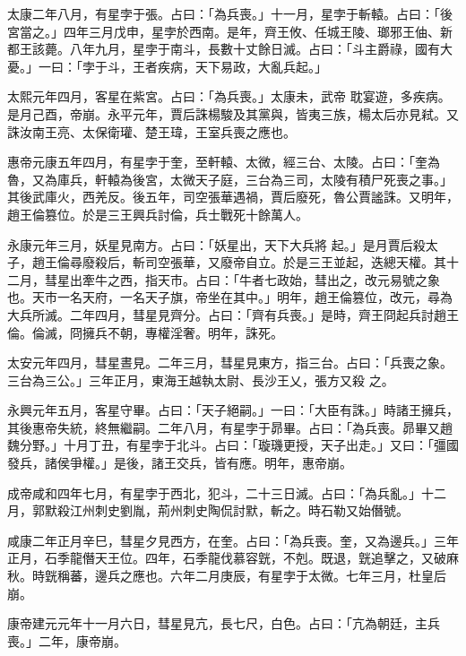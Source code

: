 \begin{pinyinscope}
 太康二年八月，有星孛于張。占曰：「為兵喪。」十一月，星孛于斬轅。占曰：「後宮當之。」四年三月戊申，星孛於西南。是年，齊王攸、任城王陵、瑯邪王伷、新都王該薨。八年九月，星孛于南斗，長數十丈餘日滅。占曰：「斗主爵祿，國有大憂。」一曰：「孛于斗，王者疾病，天下易政，大亂兵起。」



 太熙元年四月，客星在紫宮。占曰：「為兵喪。」太康未，武帝
 耽宴遊，多疾病。是月己酉，帝崩。永平元年，賈后誅楊駿及其黨與，皆夷三族，楊太后亦見弒。又誅汝南王亮、太保衛瓘、楚王瑋，王室兵喪之應也。



 惠帝元康五年四月，有星孛于奎，至軒轅、太微，經三台、太陵。占曰：「奎為魯，又為庫兵，軒轅為後宮，太微天子庭，三台為三司，太陵有積尸死喪之事。」其後武庫火，西羌反。後五年，司空張華遇禍，賈后廢死，魯公賈謐誅。又明年，趙王倫篡位。於是三王興兵討倫，兵士戰死十餘萬人。



 永康元年三月，妖星見南方。占曰：「妖星出，天下大兵將
 起。」是月賈后殺太子，趙王倫尋廢殺后，斬司空張華，又廢帝自立。於是三王並起，迭總天權。其十二月，彗星出牽牛之西，指天市。占曰：「牛者七政始，彗出之，改元易號之象也。天市一名天府，一名天子旗，帝坐在其中。」明年，趙王倫篡位，改元，尋為大兵所滅。二年四月，彗星見齊分。占曰：「齊有兵喪。」是時，齊王冏起兵討趙王倫。倫滅，冏擁兵不朝，專權淫奢。明年，誅死。



 太安元年四月，彗星晝見。二年三月，彗星見東方，指三台。占曰：「兵喪之象。三台為三公。」三年正月，東海王越執太尉、長沙王乂，張方又殺
 之。



 永興元年五月，客星守畢。占曰：「天子絕嗣。」一曰：「大臣有誅。」時諸王擁兵，其後惠帝失統，終無繼嗣。二年八月，有星孛于昴畢。占曰：「為兵喪。昴畢又趙魏分野。」十月丁丑，有星孛于北斗。占曰：「璇璣更授，天子出走。」又曰：「彊國發兵，諸侯爭權。」是後，諸王交兵，皆有應。明年，惠帝崩。



 成帝咸和四年七月，有星孛于西北，犯斗，二十三日滅。占曰：「為兵亂。」十二月，郭默殺江州刺史劉胤，荊州刺史陶侃討默，斬之。時石勒又始僭號。



 咸康二年正月辛巳，彗星夕見西方，在奎。占曰：「為兵喪。奎，又為邊兵。」三年正月，石季龍僭天王位。四年，石季龍伐慕容皝，不剋。既退，皝追擊之，又破麻秋。時皝稱蕃，邊兵之應也。六年二月庚辰，有星孛于太微。七年三月，杜皇后崩。



 康帝建元元年十一月六日，彗星見亢，長七尺，白色。占曰：「亢為朝廷，主兵喪。」二年，康帝崩。




\end{pinyinscope}
